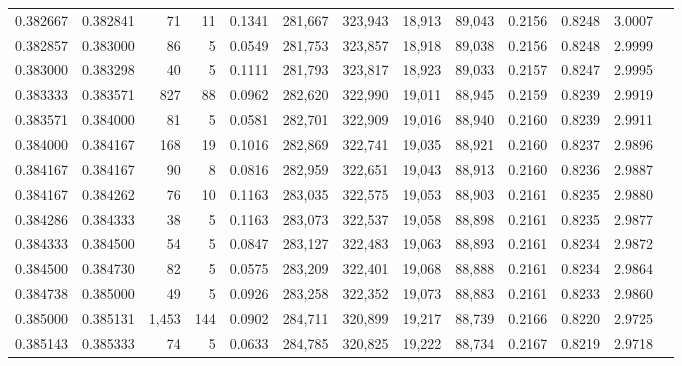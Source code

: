\begin{tabular}{rrrrrrrrrrrrr}
0.382667 & 0.382841 &    71 &  11 &                                     0.1341 & 281,667 & 323,943 &  18,913 &  89,043 & 0.2156 & 0.8248 & 3.0007 \\
0.382857 & 0.383000 &    86 &   5 &                                     0.0549 & 281,753 & 323,857 &  18,918 &  89,038 & 0.2156 & 0.8248 & 2.9999 \\
0.383000 & 0.383298 &    40 &   5 &                                     0.1111 & 281,793 & 323,817 &  18,923 &  89,033 & 0.2157 & 0.8247 & 2.9995 \\
0.383333 & 0.383571 &   827 &  88 &                                     0.0962 & 282,620 & 322,990 &  19,011 &  88,945 & 0.2159 & 0.8239 & 2.9919 \\
0.383571 & 0.384000 &    81 &   5 &                                     0.0581 & 282,701 & 322,909 &  19,016 &  88,940 & 0.2160 & 0.8239 & 2.9911 \\
0.384000 & 0.384167 &   168 &  19 &                                     0.1016 & 282,869 & 322,741 &  19,035 &  88,921 & 0.2160 & 0.8237 & 2.9896 \\
0.384167 & 0.384167 &    90 &   8 &                                     0.0816 & 282,959 & 322,651 &  19,043 &  88,913 & 0.2160 & 0.8236 & 2.9887 \\
0.384167 & 0.384262 &    76 &  10 &                                     0.1163 & 283,035 & 322,575 &  19,053 &  88,903 & 0.2161 & 0.8235 & 2.9880 \\
0.384286 & 0.384333 &    38 &   5 &                                     0.1163 & 283,073 & 322,537 &  19,058 &  88,898 & 0.2161 & 0.8235 & 2.9877 \\
0.384333 & 0.384500 &    54 &   5 &                                     0.0847 & 283,127 & 322,483 &  19,063 &  88,893 & 0.2161 & 0.8234 & 2.9872 \\
0.384500 & 0.384730 &    82 &   5 &                                     0.0575 & 283,209 & 322,401 &  19,068 &  88,888 & 0.2161 & 0.8234 & 2.9864 \\
0.384738 & 0.385000 &    49 &   5 &                                     0.0926 & 283,258 & 322,352 &  19,073 &  88,883 & 0.2161 & 0.8233 & 2.9860 \\
0.385000 & 0.385131 & 1,453 & 144 &                                     0.0902 & 284,711 & 320,899 &  19,217 &  88,739 & 0.2166 & 0.8220 & 2.9725 \\
0.385143 & 0.385333 &    74 &   5 &                                     0.0633 & 284,785 & 320,825 &  19,222 &  88,734 & 0.2167 & 0.8219 & 2.9718 \\

\end{tabular}
